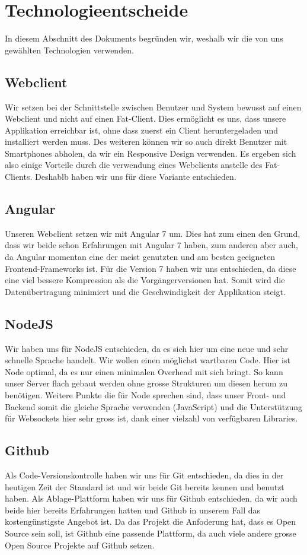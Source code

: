 	\section{Technologieentscheide}
	In diesem Abschnitt des Dokuments begründen wir, weshalb wir die von uns gewählten Technologien verwenden.

	\subsection{Webclient}
	Wir setzen bei der Schnittstelle zwischen Benutzer und System bewusst auf einen Webclient und nicht auf einen Fat-Client. Dies ermöglicht es uns, dass unsere Applikation erreichbar ist, ohne dass zuerst ein Client heruntergeladen und installiert werden muss. Des weiteren können wir so auch direkt Benutzer mit Smartphones abholen, da wir ein Responsive Design verwenden. Es ergeben sich also einige Vorteile durch die verwendung eines Webclients anstelle des Fat-Clients. Deshablb haben wir uns für diese Variante entschieden.

	\subsection{Angular}
	Unseren Webclient setzen wir mit Angular 7 um. Dies hat zum einen den Grund, dass wir beide schon Erfahrungen mit Angular 7 haben, zum anderen aber auch, da Angular momentan eine der meist genutzten und am besten geeigneten Frontend-Frameworks ist. Für die Version 7 haben wir uns entschieden, da diese eine viel bessere Kompression als die Vorgängerversionen hat. Somit wird die Datenübertragung minimiert und die Geschwindigkeit der Applikation steigt.

	\subsection{NodeJS}
	Wir haben uns für NodeJS entschieden, da es sich hier um eine neue und sehr schnelle Sprache handelt. Wir wollen einen möglichst wartbaren Code. Hier ist Node optimal, da es nur einen minimalen Overhead mit sich bringt. So kann unser Server flach gebaut werden ohne grosse Strukturen um diesen herum zu benötigen. Weitere Punkte die für Node sprechen sind, dass unser Front- und Backend somit die gleiche Sprache verwenden (JavaScript) und die Unterstützung für Websockets hier sehr gross ist, dank einer vielzahl von verfügbaren Libraries.

	\subsection{Github}
	Als Code-Versionskontrolle haben wir uns für Git entschieden, da dies in der heutigen Zeit der Standard ist und wir beide Git bereits kennen und benutzt haben. Als Ablage-Plattform haben wir uns für Github entschieden, da wir auch beide hier bereits Erfahrungen hatten und Github in unserem Fall das kostengünstigste Angebot ist. Da das Projekt die Anfoderung hat, dass es Open Source sein soll, ist Github eine passende Plattform, da auch viele andere grosse Open Source Projekte auf Github setzen.

